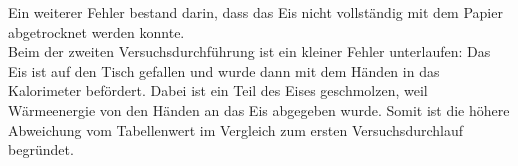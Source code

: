\documentclass[a4paper,12pt]{article}
\begin{document}
Ein weiterer Fehler bestand darin, dass das Eis nicht vollständig mit dem Papier abgetrocknet werden konnte.\\

Beim der zweiten Versuchsdurchführung ist ein kleiner Fehler unterlaufen: Das Eis ist auf den Tisch gefallen und wurde dann mit dem Händen in das Kalorimeter befördert. Dabei ist ein Teil des Eises geschmolzen, weil Wärmeenergie von den Händen an das Eis abgegeben wurde. Somit ist die höhere Abweichung vom Tabellenwert im Vergleich zum ersten Versuchsdurchlauf begründet.



\end{document}
